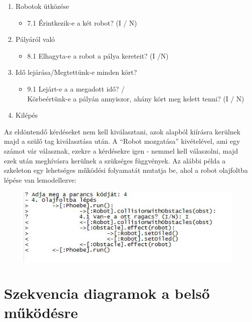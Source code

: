 \begin{enumerate}
\item Robotok ütközése
\begin{itemize}
\item 7.1 Érintkezik-e a két robot? (I / N)
\end{itemize}

\item Pályáról való 
\begin{itemize}
\item 8.1 Elhagyta-e a robot a pálya kereteit? (I /N)
\end{itemize}

\item Idő lejárása/Megtettünk-e minden kört?
\begin{itemize}
\item 9.1 Lejárt-e a a megadott idő? /\\ Körbeértünk-e a pályán annyiszor, ahány kört meg kelett tenni? (I / N)
\end{itemize}

\item Kilépés
\end{enumerate}
\pagebreak
Az eldöntendő kérdéseket nem kell kiválasztani, azok alapból kiírásra kerülnek majd a szülő tag kiválasztása után. A “Robot mozgatása” kivételével, ami egy számot vár válasznak, ezekre a kérdésekre igen - nemmel kell válaszolni, majd ezek után meghívásra kerülnek a szükséges függvények.
Az alábbi példa a szkeleton egy lehetséges működési folyamatát mutatja be, ahol a robot olajfoltba lépése van lemodellezve:


\begin{figure}[h]
\begin{center}
\includegraphics[width=17cm]{images/szkeleton.JPG}
\label{fig:example2}
\end{center}
\end{figure}

\pagebreak

\section{Szekvencia diagramok a belső működésre}

